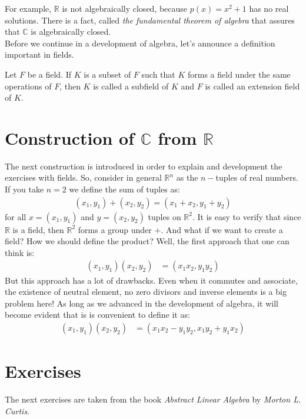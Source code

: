 \documentclass{tufte-handout}
\begin{document}
For example, $\mathbb{R}$ is not algebraically closed, because $p(x) = x^2+1$ has no real solutions. There is a fact, called \textit{the fundamental theorem of algebra} that assures that $\mathbb{C}$ is algebraically closed.\\

Before we continue in a development of algebra, let's announce a definition important in fields.

\begin{definition}[Subfield]
	Let $F$ be a field. If $K$ is a subset of $F$ such that $K$ forms a field under the same operations of $F$, then $K$ is called a subfield of $K$ and $F$ is called an extension field of $K$.
\end{definition}


\section{Construction of $\mathbb{C}$ from $\mathbb{R}$}
The next construction is introduced in order to explain and development the exercises with fields. So, consider in general $\mathbb{R}^n$ as the $n-$tuples of real numbers. If you take $n =2$ we define the sum of tuples as:
\begin{align*}
	(x_1, y_1) + (x_2, y_2) = (x_1 + x_2, y_1 + y_2)
\end{align*}
for all $x = (x_1, y_1)$ and $y = (x_2, y_2)$ tuples on $\mathbb{R}^2$. It is easy to verify that since $\mathbb{R}$ is a field, then $\mathbb{R}^2$ forms a group under $+$. And what if we want to create a field? How we should define the product? Well, the first approach that one can think is:
\begin{align*}
	(x_1, y_1)(x_2, y_2) &= (x_1x_2, y_1y_2)
\end{align*}
But this approach has a lot of drawbacks. Even when it commutes and associate, the existence of neutral element, no zero divisors and inverse elements is a big problem here! As long as we advanced in the development of algebra, it will become evident that is is convenient to define it as:
\begin{align*}
	(x_1, y_1)(x_2, y_2) &= (x_1x_2-y_1y_2, x_1y_2+y_1x_2)
\end{align*}

\section{Exercises}
The next exercises are taken from the book \textit{Abstract Linear Algebra} by \textit{Morton L. Curtis}.
\end{document}
